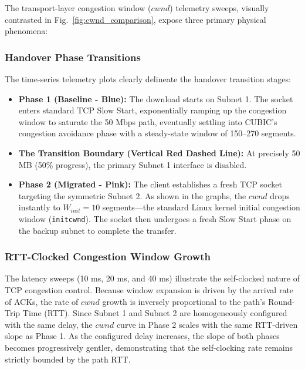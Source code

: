 \documentclass[conference]{IEEEtran}
\begin{document}
The transport-layer congestion window ($cwnd$) telemetry sweeps, visually contrasted in Fig.~\ref{fig:cwnd_comparison}, expose three primary physical phenomena:

\subsubsection{Handover Phase Transitions}
The time-series telemetry plots clearly delineate the handover transition stages:
\begin{itemize}
    \item \textbf{Phase 1 (Baseline - Blue):} The download starts on Subnet 1. The socket enters standard TCP Slow Start, exponentially ramping up the congestion window to saturate the 50 Mbps path, eventually settling into CUBIC's congestion avoidance phase with a steady-state window of 150--270 segments.
    \item \textbf{The Transition Boundary (Vertical Red Dashed Line):} At precisely 50 MB (50\% progress), the primary Subnet 1 interface is disabled.
    \item \textbf{Phase 2 (Migrated - Pink):} The client establishes a fresh TCP socket targeting the symmetric Subnet 2. As shown in the graphs, the $cwnd$ drops instantly to $W_{init} = 10$ segments—the standard Linux kernel initial congestion window (\texttt{initcwnd}). The socket then undergoes a fresh Slow Start phase on the backup subnet to complete the transfer.
\end{itemize}

\subsubsection{RTT-Clocked Congestion Window Growth}
The latency sweeps (10 ms, 20 ms, and 40 ms) illustrate the self-clocked nature of TCP congestion control. Because window expansion is driven by the arrival rate of ACKs, the rate of $cwnd$ growth is inversely proportional to the path's Round-Trip Time (RTT). Since Subnet 1 and Subnet 2 are homogeneously configured with the same delay, the $cwnd$ curve in Phase 2 scales with the same RTT-driven slope as Phase 1. As the configured delay increases, the slope of both phases becomes progressively gentler, demonstrating that the self-clocking rate remains strictly bounded by the path RTT.
\end{document}
